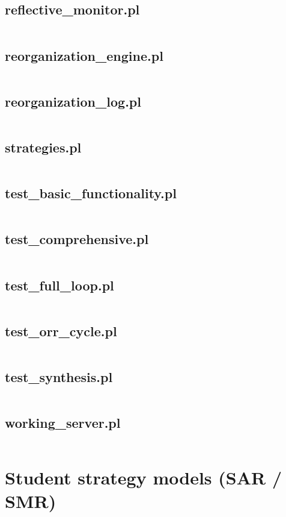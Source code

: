 \documentclass{article}
\begin{document}
\subsection{reflective\_monitor.pl}
\inputminted{prolog}{reflective_monitor.pl}
\subsection{reorganization\_engine.pl}
\inputminted{prolog}{reorganization_engine.pl}
\subsection{reorganization\_log.pl}
\inputminted{prolog}{reorganization_log.pl}
\subsection{strategies.pl}
\inputminted{prolog}{strategies.pl}
\subsection{test\_basic\_functionality.pl}
\inputminted{prolog}{test_basic_functionality.pl}
\subsection{test\_comprehensive.pl}
\inputminted{prolog}{test_comprehensive.pl}
\subsection{test\_full\_loop.pl}
\inputminted{prolog}{test_full_loop.pl}
\subsection{test\_orr\_cycle.pl}
\inputminted{prolog}{test_orr_cycle.pl}
\subsection{test\_synthesis.pl}
\inputminted{prolog}{test_synthesis.pl}
\subsection{working\_server.pl}
\inputminted{prolog}{working_server.pl}

\section{Student strategy models (SAR / SMR)}
\end{document}
